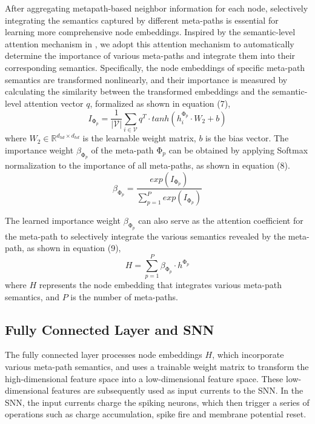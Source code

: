 \documentclass[letterpaper]{article} %
\begin{document}
After aggregating metapath-based neighbor information for each node, selectively integrating the semantics captured by different meta-paths is essential for learning more comprehensive node embeddings. Inspired by the semantic-level attention mechanism in \cite{bib10}, we adopt this attention mechanism to automatically determine the importance of various meta-paths and integrate them into their corresponding semantics. Specifically, the node embeddings of specific meta-path semantics are transformed nonlinearly, and their importance is measured by calculating the similarity between the transformed embeddings and the semantic-level attention vector $q$, formalized as shown in equation (7), 
\begin{equation}
I_{\mathrm{\Phi}_p}=\frac{1}{\left|\mathcal{V}\right|}\sum_{i\in\mathcal{V}}{q^T\cdot tanh\left(h_i^{\mathrm{\Phi}_p}\cdot W_2+b\right)}
\label{eq7}
\end{equation}
where $W_2\in\mathbb{R}^{d_{hd}\times d_{hd}}$ is the learnable weight matrix, $b$ is the bias vector. The importance weight $\beta_{\mathrm{\Phi}_p}$ of the meta-path $\mathrm{\Phi}_p$ can be obtained by applying Softmax normalization to the importance of all meta-paths, as shown in equation (8).
\begin{equation}
\beta_{\mathrm{\Phi}_p}=\frac{exp\left(I_{\mathrm{\Phi}_p}\right)}{\sum_{p=1}^{P}exp\left(I_{\mathrm{\Phi}_p}\right)}
\label{eq8}
\end{equation}

The learned importance weight $\beta_{\mathrm{\Phi}_p}$ can also serve as the attention coefficient for the meta-path to selectively integrate the various semantics revealed by the meta-path, as shown in equation (9),
\begin{equation}
H=\sum_{p=1}^{P}{\beta_{\mathrm{\Phi}_p}\cdot}h^{\mathrm{\Phi}_p}
\label{eq9}
\end{equation}
where $H$ represents the node embedding that integrates various meta-path semantics, and $P$ is the number of meta-paths.

\subsection{Fully Connected Layer and SNN}
The fully connected layer processes node embeddings $H$, which incorporate various meta-path semantics, and uses a trainable weight matrix to transform the high-dimensional feature space into a low-dimensional feature space. These low-dimensional features are subsequently used as input currents to the SNN. In the SNN, the input currents charge the spiking neurons, which then trigger a series of operations such as charge accumulation, spike fire and membrane potential reset.
\end{document}
